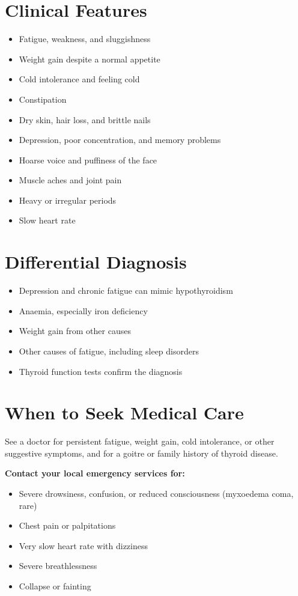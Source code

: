 \section*{Clinical Features}
\begin{itemize}
    \item Fatigue, weakness, and sluggishness
    \item Weight gain despite a normal appetite
    \item Cold intolerance and feeling cold
    \item Constipation
    \item Dry skin, hair loss, and brittle nails
    \item Depression, poor concentration, and memory problems
    \item Hoarse voice and puffiness of the face
    \item Muscle aches and joint pain
    \item Heavy or irregular periods
    \item Slow heart rate
\end{itemize}

\section*{Differential Diagnosis}
\begin{itemize}
    \item Depression and chronic fatigue can mimic hypothyroidism
    \item Anaemia, especially iron deficiency
    \item Weight gain from other causes
    \item Other causes of fatigue, including sleep disorders
    \item Thyroid function tests confirm the diagnosis
\end{itemize}

\section*{When to Seek Medical Care}
See a doctor for persistent fatigue, weight gain, cold intolerance, or other suggestive symptoms, and for a goitre or family history of thyroid disease.

\textbf{Contact your local emergency services for:}
\begin{itemize}
    \item Severe drowsiness, confusion, or reduced consciousness (myxoedema coma, rare)
    \item Chest pain or palpitations
    \item Very slow heart rate with dizziness
    \item Severe breathlessness
    \item Collapse or fainting
\end{itemize}


